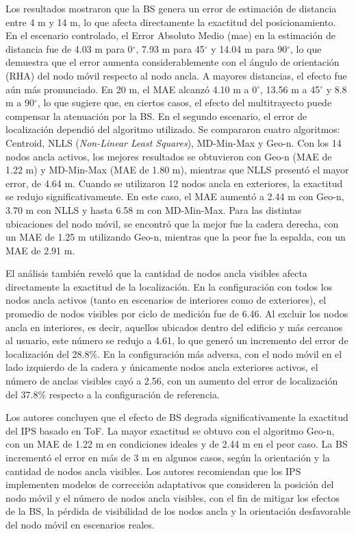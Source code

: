 \begin{enumerate}
    Los resultados mostraron que la BS genera un error de estimación de distancia entre 4 m y 14 m, lo que afecta directamente la exactitud del posicionamiento. En el escenario controlado, el Error Absoluto Medio (\gls{mae}) en la estimación de distancia fue de 4.03 m para 0$^\circ$, 7.93 m para 45$^\circ$ y 14.04 m para 90$^\circ$, lo que demuestra que el error aumenta considerablemente con el ángulo de orientación (RHA) del nodo móvil respecto al nodo ancla. A mayores distancias, el efecto fue aún más pronunciado. En 20 m, el MAE alcanzó 4.10 m a 0$^\circ$, 13.56 m a 45$^\circ$ y 8.8 m a 90$^\circ$, lo que sugiere que, en ciertos casos, el efecto del multitrayecto puede compensar la atenuación por la BS.
%
    En el segundo escenario, el error de localización dependió del algoritmo utilizado. Se compararon cuatro algoritmos: Centroid, NLLS (\textit{Non-Linear Least Squares}), MD-Min-Max y Geo-n. Con los 14 nodos ancla activos, los mejores resultados se obtuvieron con Geo-n (MAE de 1.22 m) y MD-Min-Max (MAE de 1.80 m), mientras que NLLS presentó el mayor error, de 4.64 m. Cuando se utilizaron 12 nodos ancla en exteriores, la exactitud se redujo significativamente. En este caso, el MAE aumentó a 2.44 m con Geo-n, 3.70 m con NLLS y hasta 6.58 m con MD-Min-Max. Para las distintas ubicaciones del nodo móvil, se encontró que la mejor fue la cadera derecha, con un MAE de 1.25 m utilizando Geo-n, mientras que la peor fue la espalda, con un MAE de 2.91 m.

    El análisis también reveló que la cantidad de nodos ancla visibles afecta directamente la exactitud de la localización. En la configuración con todos los nodos ancla activos (tanto en escenarios de interiores como de exteriores), el promedio de nodos visibles por ciclo de medición fue de 6.46. Al excluir los nodos ancla en interiores, es decir, aquellos ubicados dentro del edificio y más cercanos al usuario, este número se redujo a 4.61, lo que generó un incremento del error de localización del 28.8\%. En la configuración más adversa, con el nodo móvil en el lado izquierdo de la cadera y únicamente nodos ancla exteriores activos, el número de anclas visibles cayó a 2.56, con un aumento del error de localización del 37.8\% respecto a la configuración de referencia.

    Los autores concluyen que el efecto de BS degrada significativamente la exactitud del IPS basado en ToF. La mayor exactitud se obtuvo con el algoritmo Geo-n, con un MAE de 1.22 m en condiciones ideales y de 2.44 m en el peor caso. La BS incrementó el error en más de 3 m en algunos casos, según la orientación y la cantidad de nodos ancla visibles. Los autores recomiendan que los IPS implementen modelos de corrección adaptativos que consideren la posición del nodo móvil y el número de nodos ancla visibles, con el fin de mitigar los efectos de la BS, la pérdida de visibilidad de los nodos ancla y la orientación desfavorable del nodo móvil en escenarios reales.


\end{enumerate}
